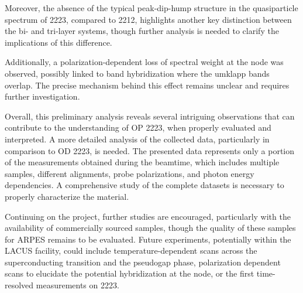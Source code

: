 Moreover, the absence of the typical peak-dip-hump structure in the quasiparticle spectrum of 2223, compared to 2212, highlights another key distinction between the bi- and tri-layer systems, though further analysis is needed to clarify the implications of this difference.

Additionally, a polarization-dependent loss of spectral weight at the node was observed, possibly linked to band hybridization where the umklapp bands overlap.
The precise mechanism behind this effect remains unclear and requires further investigation.

Overall, this preliminary analysis reveals several intriguing observations that can contribute to the understanding of OP 2223, when properly evaluated and interpreted.
A more detailed analysis of the collected data, particularly in comparison to OD 2223, is needed.
The presented data represents only a portion of the measurements obtained during the beamtime, which includes multiple samples, different alignments, probe polarizations, and photon energy dependencies.
A comprehensive study of the complete datasets is necessary to properly characterize the material.

Continuing on the project, further studies are encouraged, particularly with the availability of commercially sourced samples, though the quality of these samples for ARPES remains to be evaluated.
Future experiments, potentially within the LACUS facility, could include temperature-dependent scans across the superconducting transition and the pseudogap phase, polarization dependent scans to elucidate the potential hybridization at the node, or the first time-resolved measurements on 2223.